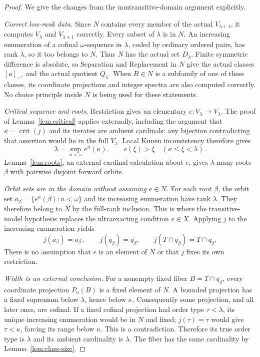 \documentclass[11pt,letterpaper]{article}
\theoremstyle{definition}
\newcommand{\crit}{\operatorname{crit}}
\numberwithin{equation}{section}
\begin{document}
\begin{proof}
We give the changes from the nontransitive-domain argument explicitly.

\emph{Correct low-rank data.} Since $N$ contains every member of the actual $V_{\lambda+1}$, it computes $V_\lambda$ and $V_{\lambda+1}$ correctly. Every subset of $\lambda$ is in $N$. An increasing enumeration of a cofinal $\omega$-sequence in $\lambda$, coded by ordinary ordered pairs, has rank $\lambda$, so it too belongs to $N$. Thus $N$ has the actual set $D_\lambda$. Finite symmetric difference is absolute, so Separation and Replacement in $N$ give the actual classes $[a]_{=^{*}}$ and the actual quotient $Q_\lambda$. When $B\in N$ is a subfamily of one of these classes, its coordinate projections and integer spectra are also computed correctly. No choice principle inside $N$ is being used for these statements.

\emph{Critical sequence and roots.} Restriction gives an elementary $e:V_\lambda\to V_\lambda$. The proof of Lemma~\ref{lem:critical} applies externally, including the argument that $\kappa=\crit(j)$ and its iterates are ambient cardinals: any bijection contradicting that assertion would lie in the full $V_\lambda$. Local Kunen inconsistency therefore gives
\[
\lambda=\sup_{n<\omega}e^n(\kappa),
\qquad e(\xi)>\xi\quad(\kappa\le\xi<\lambda).
\]
Lemma~\ref{lem:roots}, an external cardinal calculation about $e$, gives $\lambda$ many roots $\beta$ with pairwise disjoint forward orbits.

\emph{Orbit sets are in the domain without assuming $e\in N$.} For each root $\beta$, the orbit set $a_\beta=\{e^n(\beta):n<\omega\}$ and its increasing enumeration have rank $\lambda$. They therefore belong to $N$ by the full-rank inclusion. This is where the transitive-model hypothesis replaces the ultraexacting condition $e\in X$. Applying $j$ to the increasing enumeration yields
\[
j(a_\beta)=a_\beta^-,\qquad
j(q_\beta)=q_\beta,\qquad
j(T\cap q_\beta)=T\cap q_\beta.
\]
There is no assumption that $e$ is an element of $N$ or that $j$ fixes its own restriction.

\emph{Width is an external conclusion.} For a nonempty fixed fiber $B=T\cap q_\beta$, every coordinate projection $P_n(B)$ is a fixed element of $N$. A bounded projection has a fixed supremum below $\lambda$, hence below $\kappa$. Consequently some projection, and all later ones, are cofinal. If a fixed cofinal projection had order type $\tau<\lambda$, its unique increasing enumeration would be in $N$ and fixed; $j(\tau)=\tau$ would give $\tau<\kappa$, forcing its range below $\kappa$. This is a contradiction. Therefore its true order type is $\lambda$ and its ambient cardinality is $\lambda$. The fiber has the same cardinality by Lemma~\ref{lem:class-size}.


\end{proof}
\end{document}
